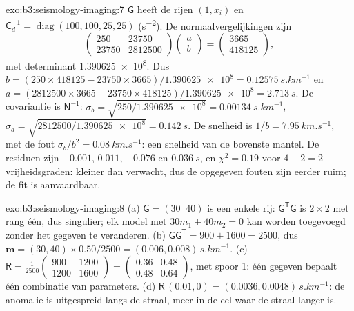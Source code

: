 \begin{solution}{exo:b3:seismology-imaging:7}
$\mathsf G$ heeft de rijen $(1, x_i)$ en $\mathsf C_d^{-1} = \operatorname{diag}
(100, 100, 25, 25)$ (\unit{s^{-2}}). De normaalvergelijkingen zijn
\[
  \begin{pmatrix} 250 & 23750 \\ 23750 & \num{2812500} \end{pmatrix}
  \begin{pmatrix} a \\ b \end{pmatrix}
  = \begin{pmatrix} 3665 \\ 418125 \end{pmatrix},
\]
met determinant \num{1.390625e8}. Dus $b = (250\times418125 -
23750\times3665)/\num{1.390625e8} = \qty{0.12575}{s.km^{-1}}$ en
$a = (2812500\times3665 - 23750\times418125)/\num{1.390625e8} =
\qty{2.713}{s}$. De covariantie is $\mathsf N^{-1}$: $\sigma_b =
\sqrt{250/\num{1.390625e8}} = \qty{0.00134}{s.km^{-1}}$, $\sigma_a =
\sqrt{2812500/\num{1.390625e8}} = \qty{0.142}{s}$. De snelheid is
$1/b = \qty{7.95}{km.s^{-1}}$, met de fout $\sigma_b/b^2 =
\qty{0.08}{km.s^{-1}}$: een snelheid van de bovenste mantel. De residuen zijn $-0.001$,
$0.011$, $-0.076$ en $\qty{0.036}{s}$, en $\chi^2 = 0.19$ voor $4 - 2 = 2$
vrijheidsgraden: kleiner dan verwacht, dus de opgegeven fouten zijn eerder
ruim; de fit is aanvaardbaar.
\end{solution}

\begin{solution}{exo:b3:seismology-imaging:8}
(a) $\mathsf G = (30\;\;40)$ is een enkele rij: $\mathsf G^{\mathsf T}\mathsf G$ is
$2\times2$ met rang één, dus singulier; elk model met $30m_1 + 40m_2 = 0$ kan
worden toegevoegd zonder het gegeven te veranderen. (b) $\mathsf G\mathsf G^{\mathsf T} =
900 + 1600 = 2500$, dus $\mathbf m = (30, 40)\times0.50/2500 =
(0.006, 0.008)\,\unit{s.km^{-1}}$. (c) $\mathsf R = \frac{1}{2500}
\begin{pmatrix} 900 & 1200 \\ 1200 & 1600 \end{pmatrix} =
\begin{pmatrix} 0.36 & 0.48 \\ 0.48 & 0.64 \end{pmatrix}$, met spoor 1:
één gegeven bepaalt één combinatie van parameters. (d) $\mathsf R\,(0.01, 0) =
(0.0036, 0.0048)\,\unit{s.km^{-1}}$: de anomalie is uitgespreid langs de straal, meer
in de cel waar de straal langer is.
\end{solution}

